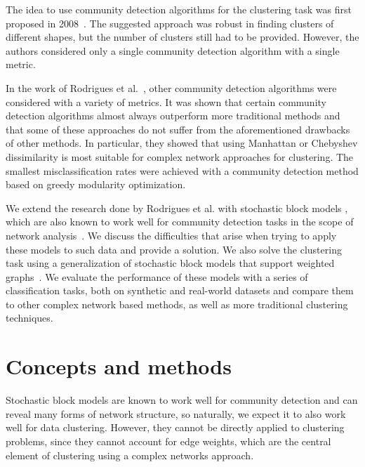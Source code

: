 \documentclass[conference]{IEEEtran}
\begin{document}
The idea to use community detection algorithms for the clustering task was first proposed in 2008~\cite{de2008data}. The suggested approach was robust in finding clusters of different shapes, but the number of clusters still had to be provided. However, the authors considered only a single community detection algorithm with a single metric.

In the work of Rodrigues et al.~\cite{rodrigues2011complex}, other community detection algorithms were considered with a variety of metrics. It was shown that certain community detection algorithms almost always outperform more traditional methods and that some of these approaches do not suffer from the aforementioned drawbacks of other methods. In particular, they showed that using Manhattan or Chebyshev dissimilarity is most suitable for complex network approaches for clustering. The smallest misclassification rates were achieved with a community detection method based on greedy modularity optimization.

We extend the research done by Rodrigues et al. with stochastic block models \cite{holland1983stochastic}, which are also known to work well for community detection tasks in the scope of network analysis~\cite{fortunato2010community}. We discuss the difficulties that arise when trying to apply these models to such data and provide a solution. We also solve the clustering task using a generalization of stochastic block models that support weighted graphs~\cite{aicher2013adapting}. We evaluate the performance of these models with a series of classification tasks, both on synthetic and real-world datasets and compare them to other complex network based methods, as well as more traditional clustering techniques.

\section{Concepts and methods}

Stochastic block models are known to work well for community detection and can reveal many forms of network structure, so naturally, we expect it to also work well for data clustering. However, they cannot be directly applied to clustering problems, since they cannot account for edge weights, which are the central element of clustering using a complex networks approach.
\end{document}
